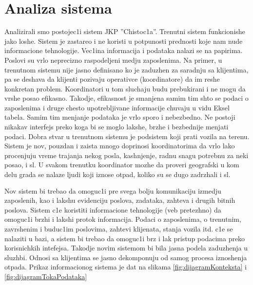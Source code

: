 \documentclass[10 pt]{article}
\begin{document}
	
	\section{Analiza sistema}
	
	Analizirali smo postojec1i sistem JKP ''Chistoc1a''. Trenutni sistem funkcionishe jako loshe. Sistem je zastareo i ne koristi u potpunosti prednosti koje nam nude informacione tehnologije. Vec1ina informacija i podataka nalazi se na papirima. Poslovi su vrlo neprecizno raspodeljeni medju zaposlenima. Na primer, u trenutnom sistemu nije jasno definisano ko je zaduzhen za saradnju sa klijentima, pa se deshava da klijenti pozivaju operativce (koordinatore) da im reshe konkretan problem. Koordinatori u tom sluchaju budu prebukirani i ne mogu da vrshe posao efikasno. Takodje, efikasnost je smanjena samim tim shto se podaci o zaposlenima i druge chesto upotrebljivane informacije chuvaju u vidu Eksel tabela. Samim tim menjanje podataka je vrlo sporo i nebezbedno. Ne postoji nikakav interfejs preko koga bi se moglo lakshe, brzhe i bezbednije menjati podaci. Dobra stvar u trenutnom sistemu je podsistem koji prati vozila na terenu. Sistem je nov, pouzdan i zaista mnogo doprinosi koordinatorima da  vrlo lako procenjuju vreme trajanja nekog posla, kashnjenje, radnu snagu potrebnu za neki posao, i sl. U svakom trenutku koordinator mozhe da proveri geografski u kom delu grada se nalaze ljudi koji iznose otpad, koliko su se dugo zadrzhali i sl.
	
	Nov sistem bi trebao da omoguc1i pre svega bolju komunikaciju izmedju zaposlenih, kao i lakshu evidenciju poslova, zadataka, zahteva i drugih bitnih poslova. Sistem c1e koristiti informacione tehnologije (veb pretezhno) da omoguc1i brzhi i lakshi protok informacija. Podaci o zaposlenima, o trenutnim, zavrshenim i buduc1im poslovima, zahtevi klijenata, stanja vozila itd. c1e se nalaziti u bazi, a sistem bi trebao da omoguc1i brz i lak pristup podacima preko korisnichkih intefejsa. Takodje novim sistemom bi bila jasna podela zaduzhenja u sluzhbi. Odnosi sa klijentima se jasno dekomponuju od samog procesa iznoshenja otpada. Prikaz informacionog sistema je dat na slikama \ref{fig:dijagramKonteksta} i \ref{fig:dijagramTokaPodataka}
	
\end{document}
